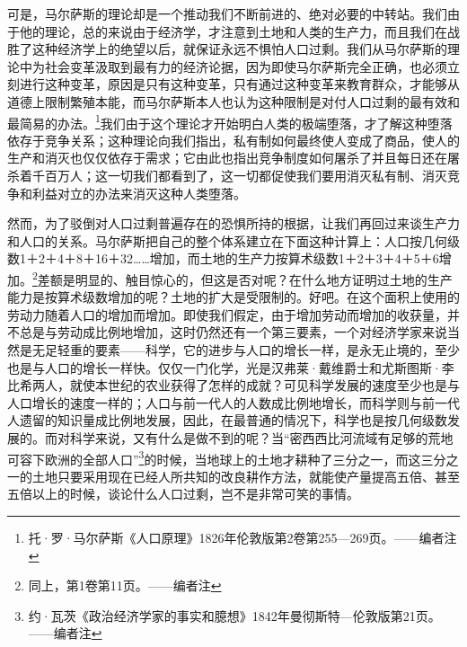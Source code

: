 \documentclass[a4paper,twoside,12pt,AutoFakeBold]{ctexart}
\begin{document}
可是，马尔萨斯的理论却是一个推动我们不断前进的、绝对必要的中转站。我们由于他的理论，总的来说由于经济学，才注意到土地和人类的生产力，而且我们在战胜了这种经济学上的绝望以后，就保证永远不惧怕人口过剩。我们从马尔萨斯的理论中为社会变革汲取到最有力的经济论据，因为即使马尔萨斯完全正确，也必须立刻进行这种变革，原因是只有这种变革，只有通过这种变革来教育群众，才能够从道德上限制繁殖本能，而马尔萨斯本人也认为这种限制是对付人口过剩的最有效和最简易的办法。\footnote{托·罗·马尔萨斯《人口原理》1826年伦敦版第2卷第255—269页。——编者注}我们由于这个理论才开始明白人类的极端堕落，才了解这种堕落依存于竞争关系；这种理论向我们指出，私有制如何最终使人变成了商品，使人的生产和消灭也仅仅依存于需求；它由此也指出竞争制度如何屠杀了并且每日还在屠杀着千百万人；这一切我们都看到了，这一切都促使我们要用消灭私有制、消灭竞争和利益对立的办法来消灭这种人类堕落。

然而，为了驳倒对人口过剩普遍存在的恐惧所持的根据，让我们再回过来谈生产力和人口的关系。马尔萨斯把自己的整个体系建立在下面这种计算上：人口按几何级数1＋2＋4＋8＋16＋32……增加，而土地的生产力按算术级数1＋2＋3＋4＋5＋6增加。\footnote{同上，第1卷第11页。——编者注 }差额是明显的、触目惊心的，但这是否对呢？在什么地方证明过土地的生产能力是按算术级数增加的呢？土地的扩大是受限制的。好吧。在这个面积上使用的劳动力随着人口的增加而增加。即使我们假定，由于增加劳动而增加的收获量，并不总是与劳动成比例地增加，这时仍然还有一个第三要素，一个对经济学家来说当然是无足轻重的要素——科学，它的进步与人口的增长一样，是永无止境的，至少也是与人口的增长一样快。仅仅一门化学，光是汉弗莱·戴维爵士和尤斯图斯·李比希两人，就使本世纪的农业获得了怎样的成就？可见科学发展的速度至少也是与人口增长的速度一样的；人口与前一代人的人数成比例地增长，而科学则与前一代人遗留的知识量成比例地发展，因此，在最普通的情况下，科学也是按几何级数发展的。而对科学来说，又有什么是做不到的呢？当“密西西比河流域有足够的荒地可容下欧洲的全部人口”\footnote{约·瓦茨《政治经济学家的事实和臆想》1842年曼彻斯特—伦敦版第21页。——编者注}的时候，当地球上的土地才耕种了三分之一，而这三分之一的土地只要采用现在已经人所共知的改良耕作方法，就能使产量提高五倍、甚至五倍以上的时候，谈论什么人口过剩，岂不是非常可笑的事情。
\end{document}
